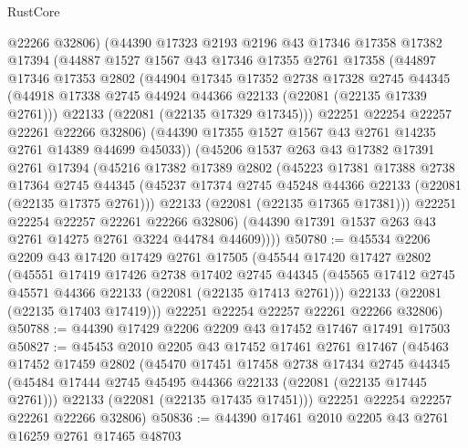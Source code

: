 \begin{lexlean}{RustCore}
\begin{coremodule}
        @22266
        @32806)
      (@44390
        @17323
        @2193
        @2196
        @43
        @17346
        @17358
        @17382
        @17394
        (@44887
          @1527
          @1567
          @43
          @17346
          @17355
          @2761
          @17358
          (@44897
            @17346
            @17353
            @2802
            (@44904
              @17345
              @17352
              @2738
              @17328
              @2745
              @44345
              (@44918 @17338 @2745 @44924 @44366 @22133 (@22081 (@22135 @17339 @2761)))
              @22133
              (@22081 (@22135 @17329 @17345)))
            @22251
            @22254
            @22257
            @22261
            @22266
            @32806)
          (@44390 @17355 @1527 @1567 @43 @2761 @14235 @2761 @14389 @44699 @45033))
        (@45206
          @1537
          @263
          @43
          @17382
          @17391
          @2761
          @17394
          (@45216
            @17382
            @17389
            @2802
            (@45223
              @17381
              @17388
              @2738
              @17364
              @2745
              @44345
              (@45237 @17374 @2745 @45248 @44366 @22133 (@22081 (@22135 @17375 @2761)))
              @22133
              (@22081 (@22135 @17365 @17381)))
            @22251
            @22254
            @22257
            @22261
            @22266
            @32806)
          (@44390 @17391 @1537 @263 @43 @2761 @14275 @2761 @3224 @44784 @44609))))
@50780 := @45534
    @2206
    @2209
    @43
    @17420
    @17429
    @2761
    @17505
    (@45544
      @17420
      @17427
      @2802
      (@45551
        @17419
        @17426
        @2738
        @17402
        @2745
        @44345
        (@45565 @17412 @2745 @45571 @44366 @22133 (@22081 (@22135 @17413 @2761)))
        @22133
        (@22081 (@22135 @17403 @17419)))
      @22251
      @22254
      @22257
      @22261
      @22266
      @32806)
@50788 := @44390 @17429 @2206 @2209 @43 @17452 @17467 @17491 @17503
@50827 := @45453
    @2010
    @2205
    @43
    @17452
    @17461
    @2761
    @17467
    (@45463
      @17452
      @17459
      @2802
      (@45470
        @17451
        @17458
        @2738
        @17434
        @2745
        @44345
        (@45484 @17444 @2745 @45495 @44366 @22133 (@22081 (@22135 @17445 @2761)))
        @22133
        (@22081 (@22135 @17435 @17451)))
      @22251
      @22254
      @22257
      @22261
      @22266
      @32806)
@50836 := @44390 @17461 @2010 @2205 @43 @2761 @16259 @2761 @17465 @48703

\end{coremodule}
\end{lexlean}
